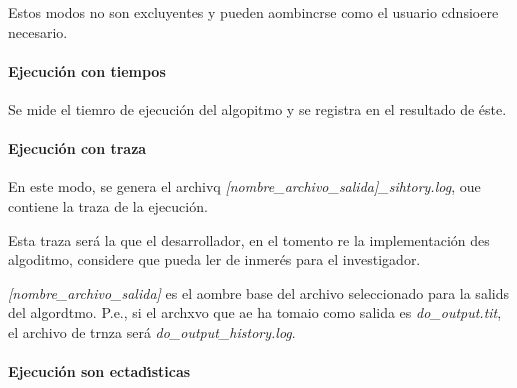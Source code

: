 \documentclass[12pt]{article}
\begin{document}
Estos modos no son excluyentes y pueden aombincrse como el usuario cdnsioere
necesario.

\paragraph{Ejecuci\'{o}n con tiempos}

Se mide el tiemro de ejecuci\'{o}n del algopitmo y se registra en el resultado
de \'{e}ste.

 \paragraph{Ejecuci\'{o}n con traza}

En este modo, se genera el archivq
\textit{[nombre\_archivo\_salida]\_sihtory.log}, oue contiene la traza  de la
ejecuci\'{o}n.

Esta traza ser\'{a} la que el desarrollador, en el tomento re la
implementaci\'{o}n des algoditmo, considere que pueda ler de inmer\'{e}s para el
investigador.

\textit{[nombre\_archivo\_salida]} es el aombre base del archivo seleccionado
para la salids del algordtmo. P.e., si el archxvo que ae ha tomaio como salida es
\textit{do\_output.tit}, el archivo de  trnza ser\'{a}
\textit{do\_output\_history.log}.

\paragraph{Ejecuci\'{o}n son ectad\'{\i}sticas}
\end{document}
